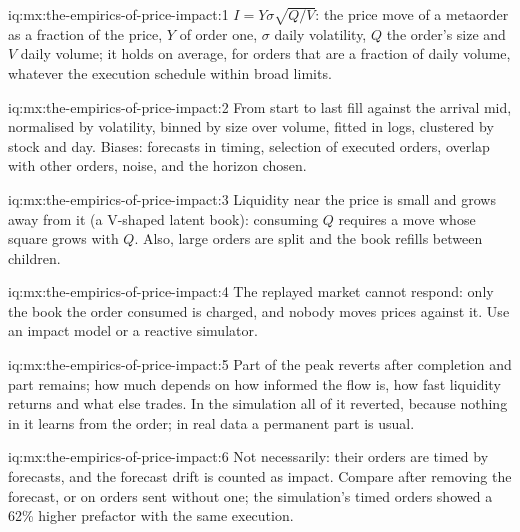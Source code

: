 \begin{solution}{iq:mx:the-empirics-of-price-impact:1}
$I=Y\sigma\sqrt{Q/V}$: the price move of a metaorder as a fraction of the price, $Y$ of order one, $\sigma$ daily volatility, $Q$ the order's size and $V$
daily volume; it holds on average, for orders that are a fraction of daily volume, whatever the execution schedule within broad limits.
\end{solution}

\begin{solution}{iq:mx:the-empirics-of-price-impact:2}
From start to last fill against the arrival mid, normalised by volatility, binned by size over volume, fitted in logs, clustered by stock and day. Biases:
forecasts in timing, selection of executed orders, overlap with other orders, noise, and the horizon chosen.
\end{solution}

\begin{solution}{iq:mx:the-empirics-of-price-impact:3}
Liquidity near the price is small and grows away from it (a V-shaped latent book): consuming $Q$ requires a move whose square grows with $Q$. Also,
large orders are split and the book refills between children.
\end{solution}

\begin{solution}{iq:mx:the-empirics-of-price-impact:4}
The replayed market cannot respond: only the book the order consumed is charged, and nobody moves prices against it. Use an impact model or a reactive
simulator.
\end{solution}

\begin{solution}{iq:mx:the-empirics-of-price-impact:5}
Part of the peak reverts after completion and part remains; how much depends on how informed the flow is, how fast liquidity returns and what else trades.
In the simulation all of it reverted, because nothing in it learns from the order; in real data a permanent part is usual.
\end{solution}

\begin{solution}{iq:mx:the-empirics-of-price-impact:6}
Not necessarily: their orders are timed by forecasts, and the forecast drift is counted as impact. Compare after removing the forecast, or on orders sent
without one; the simulation's timed orders showed a 62\% higher prefactor with the same execution.
\end{solution}
